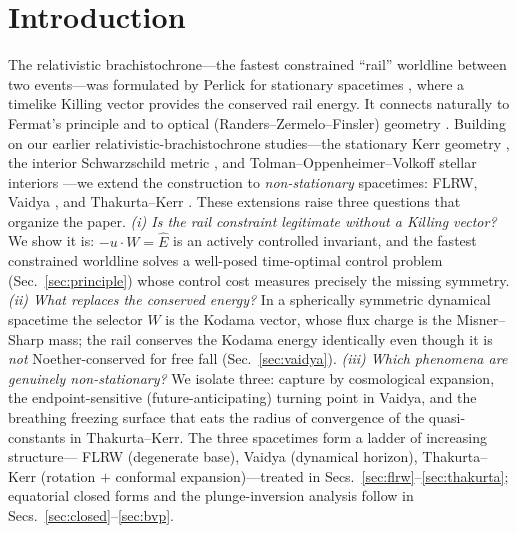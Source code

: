 \documentclass[12pt]{iopart}
\newcommand{\Ehat}{\hat E}
\begin{document}
\maketitle

\makeatletter
\renewcommand{\numberline}[1]{#1\enspace}
\makeatother
{\hypersetup{linkcolor=black}\tableofcontents}


\section{Introduction}
\label{sec:intro}
The relativistic brachistochrone---the fastest constrained ``rail'' worldline
between two events---was formulated by Perlick for stationary spacetimes
\cite{Perlick1991,PerlickRayOptics}, where a timelike Killing vector provides
the conserved rail energy. It connects naturally to Fermat's principle and to
optical (Randers--Zermelo--Finsler) geometry
\cite{Kovner1990,Randers1941,GibbonsWerner2008,GibbonsRanders2009,BaoRoblesShen}.
Building on our earlier relativistic-brachistochrone studies---the stationary
Kerr geometry \cite{RosignoliKerr}, the interior Schwarzschild metric
\cite{RosignoliIntSchw}, and Tolman--Oppenheimer--Volkoff stellar interiors
\cite{RosignoliTOV}---we extend the construction to \emph{non-stationary}
spacetimes: FLRW, Vaidya \cite{Vaidya1951}, and Thakurta--Kerr
\cite{Thakurta1981}.
These extensions raise three questions that organize the paper.
\emph{(i) Is the rail constraint legitimate without a Killing vector?} We show it
is: $-u\cdot W=\Ehat$ is an actively controlled invariant, and the fastest
constrained worldline solves a well-posed time-optimal control problem
(Sec.~\ref{sec:principle}) whose control cost measures precisely the missing
symmetry. \emph{(ii) What replaces the conserved energy?} In a spherically
symmetric dynamical spacetime the selector $W$ is the Kodama vector, whose flux
charge is the Misner--Sharp mass; the rail conserves the Kodama energy
identically even though it is \emph{not} Noether-conserved for free fall
(Sec.~\ref{sec:vaidya}). \emph{(iii) Which phenomena are genuinely
non-stationary?} We isolate three: capture by cosmological expansion, the
endpoint-sensitive (future-anticipating) turning point in Vaidya, and the breathing
freezing surface that eats the radius of convergence of the quasi-constants in
Thakurta--Kerr. The three spacetimes form a ladder of increasing structure---%
FLRW (degenerate base), Vaidya (dynamical horizon), Thakurta--Kerr
(rotation $+$ conformal expansion)---treated in
Secs.~\ref{sec:flrw}--\ref{sec:thakurta}; equatorial closed forms and the
plunge-inversion analysis follow in Secs.~\ref{sec:closed}--\ref{sec:bvp}.
\end{document}
